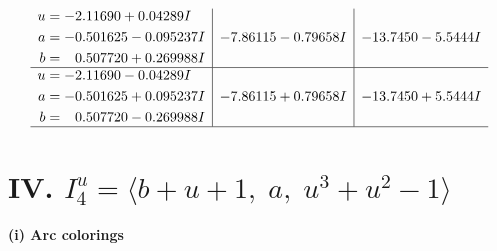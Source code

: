\documentclass[1p]{elsarticle_modified}
\theoremstyle{definition}
\begin{document}
$$\begin{array}{c|c|c}
\begin{aligned}
u &= -2.11690 + 0.04289 I \\
a &= -0.501625 - 0.095237 I \\
b &= \phantom{-}0.507720 + 0.269988 I\end{aligned}
 & -7.86115 - 0.79658 I & -13.7450 - 5.5444 I \\ \hline\begin{aligned}
u &= -2.11690 - 0.04289 I \\
a &= -0.501625 + 0.095237 I \\
b &= \phantom{-}0.507720 - 0.269988 I\end{aligned}
 & -7.86115 + 0.79658 I & -13.7450 + 5.5444 I\\
 \hline 
 \end{array}$$\newpage\newpage\renewcommand{\arraystretch}{1}
\centering \section*{IV. $I^u_{4}= \langle b+u+1,\;a,\;u^3+u^2-1 \rangle$}
\flushleft \textbf{(i) Arc colorings}\\
\end{document}
